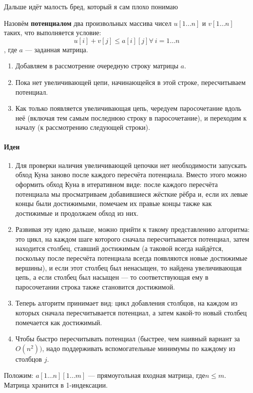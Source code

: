 \documentclass[a4paper,12pt]{article}
\begin{document}
Дальше идёт малость бред, который я сам плохо понимаю

Назовём \textbf{потенциалом} два произвольных массива чисел $u[1 \ldots n]$ и $v[1 \ldots n]$ таких, что выполняется условие:
\[u[i] + v[j] \leqslant a[i][j] \forall\ i = 1 \ldots n\], где $a$ — заданная матрица.
\begin{enumerate}
    \item Добавляем в рассмотрение очередную строку матрицы $a$.
    \item Пока нет увеличивающей цепи, начинающейся в этой строке, пересчитываем потенциал.
    \item Как только появляется увеличивающая цепь, чередуем паросочетание вдоль неё (включая тем самым последнюю строку в паросочетание), и переходим к началу (к рассмотрению следующей строки).
\end{enumerate}

\paragraph{Идеи}
\begin{enumerate}
    \item Для проверки наличия увеличивающей цепочки нет необходимости запускать обход Куна заново после каждого пересчёта потенциала. Вместо этого можно оформить обход Куна в итеративном виде: после каждого пересчёта потенциала мы просматриваем добавившиеся жёсткие рёбра и, если их левые концы были достижимыми, помечаем их правые концы также как достижимые и продолжаем обход из них.
    \item Развивая эту идею дальше, можно прийти к такому представлению алгоритма: это цикл, на каждом шаге которого сначала пересчитывается потенциал, затем находится столбец, ставший достижимым (а таковой всегда найдётся, поскольку после пересчёта потенциала всегда появляются новые достижимые вершины), и если этот столбец был ненасыщен, то найдена увеличивающая цепь, а если столбец был насыщен — то соответствующая ему в паросочетании строка также становится достижимой.
    \item Теперь алгоритм принимает вид: цикл добавления столбцов, на каждом из которых сначала пересчитывается потенциал, а затем какой-то новый столбец помечается как достижимый.
    \item Чтобы быстро пересчитывать потенциал (быстрее, чем наивный вариант за $O(n^2))$, надо поддерживать вспомогательные минимумы по каждому из столбцов $j$.
\end{enumerate}
Положим: 
$a[1 \dots n][1 \dots m]$ — прямоугольная входная матрица, где$n \leqslant m$. Матрица хранится в 1-индексации.
\end{document}
